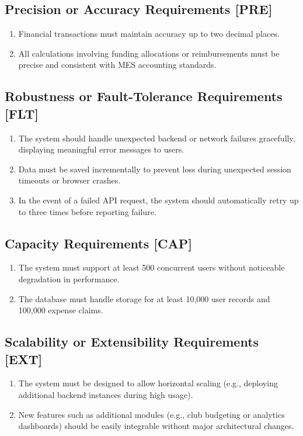 \documentclass[12pt]{article}
\begin{document}
\begin{enumerate}
  \subsection{Precision or Accuracy Requirements [PRE]}
    \begin{enumerate}
        \item Financial transactions must maintain accuracy up to two decimal places.
        \item All calculations involving funding allocations or reimbursements must be precise and consistent with MES accounting standards.
    \end{enumerate}

  \subsection{Robustness or Fault-Tolerance Requirements [FLT]}
    \begin{enumerate}
        \item The system should handle unexpected backend or network failures gracefully, displaying meaningful error messages to users.
        \item Data must be saved incrementally to prevent loss during unexpected session timeouts or browser crashes.
        \item In the event of a failed API request, the system should automatically retry up to three times before reporting failure.
    \end{enumerate}

  \subsection{Capacity Requirements [CAP]}
    \begin{enumerate}
        \item The system must support at least 500 concurrent users without noticeable degradation in performance.
        \item The database must handle storage for at least 10,000 user records and 100,000 expense claims.
    \end{enumerate}

  \subsection{Scalability or Extensibility Requirements [EXT]}
    \begin{enumerate}
        \item The system must be designed to allow horizontal scaling (e.g., deploying additional backend instances during high usage).
        \item New features such as additional modules (e.g., club budgeting or analytics dashboards) should be easily integrable without major architectural changes.
    \end{enumerate}


\end{enumerate}
\end{document}
